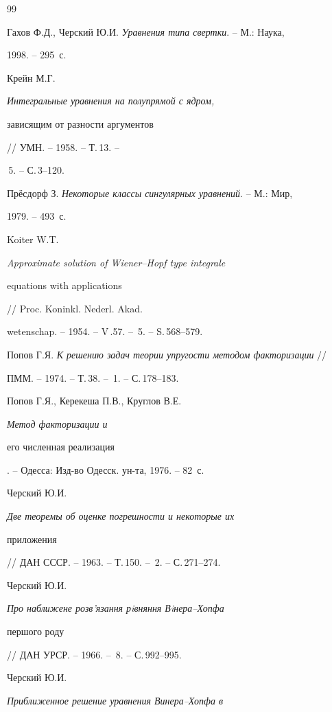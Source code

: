 \begin{thebibliography}{99}







Гахов Ф.Д., Черский Ю.И. {\em Уравнения типа свертки}. -- М.: Наука, 


1998. -- 295~с. 




Крейн М.Г. {\em Интегральные уравнения на полупрямой с ядром,


зависящим от разности аргументов} // УМН. -- 1958. -- Т.\,13. --


\No\,5. -- С.\,3--120. 




Пр\"есдорф З. {\em Некоторые классы сингулярных уравнений}. -- М.: Мир,


1979. -- 493~с. 




Koiter W.T. {\em Approximate solution of Wiener--Hopf type integrale


equations with applications} // Proc. Koninkl. Nederl. Akad.


wetenschap. -- 1954. -- V\,.57. -- \No\,5. -- S.\,568--579. 




Попов Г.Я. {\em К решению задач теории упругости методом факторизации} //


ПММ. -- 1974. -- Т.\,38. -- \No\,1. -- С.\,178--183. 




Попов Г.Я., Керекеша П.В., Круглов В.Е. {\em Метод факторизации и


его численная реализация}. -- Одесса: Изд-во Одесск. ун-та, 1976. -- 82~с. 




Черский Ю.И. {\em Две теоремы об оценке погрешности и некоторые их


приложения} // ДАН СССР. -- 1963. -- Т.\,150. -- \No\,2. -- С.\,271--274. 




Черский Ю.И. {\em Про наближене розв'язання рiвняння Вiнера--Хопфа


першого роду} // ДАН УРСР. -- 1966. -- \No\,8. -- С.\,992--995. 




Черский Ю.И. {\em Приближенное решение уравнения Винера--Хопфа в


}
\end{thebibliography}
